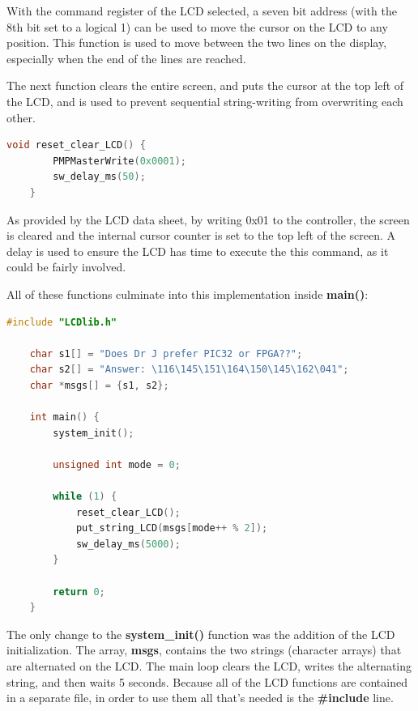 \documentclass[a4paper, 12pt]{article}
\begin{document}
With the command register of the LCD selected, a seven bit address (with the 8th bit set to a logical 1) can be used to move the cursor on the LCD to any position. This function is used to move between the two lines on the display, especially when the end of the lines are reached.

The next function clears the entire screen, and puts the cursor at the top left of the LCD, and is used to prevent sequential string-writing from overwriting each other.

	\begin{mdframed}[backgroundcolor=code-gray, roundcorner=10pt,
								innerleftmargin=5, innertopmargin=5, innerbottommargin=5]	
	\begin{lstlisting}[language=C, caption=Clearing the LCD Screen, tabsize=2]
	void reset_clear_LCD() {
		PMPMasterWrite(0x0001);
		sw_delay_ms(50);
	}
	\end{lstlisting}
	\end{mdframed}
	
As provided by the LCD data sheet, by writing 0x01 to the controller, the screen is cleared and the internal cursor counter is set to the top left of the screen. A delay is used to ensure the LCD has time to execute the this command, as it could be fairly involved.

All of these functions culminate into this implementation inside \textbf{main()}:
\newpage
	\begin{mdframed}[backgroundcolor=code-gray, roundcorner=10pt,
								innerleftmargin=5, innertopmargin=5, innerbottommargin=5]	
	\begin{lstlisting}[language=C, caption=Infinite Program Loop, tabsize=2]
	#include "LCDlib.h"

	char s1[] = "Does Dr J prefer PIC32 or FPGA??";
	char s2[] = "Answer: \116\145\151\164\150\145\162\041";
	char *msgs[] = {s1, s2};

	int main() {
		system_init();

		unsigned int mode = 0;
	
		while (1) {
			reset_clear_LCD();
			put_string_LCD(msgs[mode++ % 2]);
			sw_delay_ms(5000);
		}
	
		return 0;
	}
	\end{lstlisting}
	\end{mdframed}
	
The only change to the \textbf{system\_init()} function was the addition of the LCD initialization. The array, \textbf{msgs}, contains the two strings (character arrays) that are alternated on the LCD. The main loop clears the LCD, writes the alternating string, and then waits 5 seconds. Because all of the LCD functions are contained in a separate file, in order to use them all that's needed is the \textbf{\#include} line.
\end{document}

